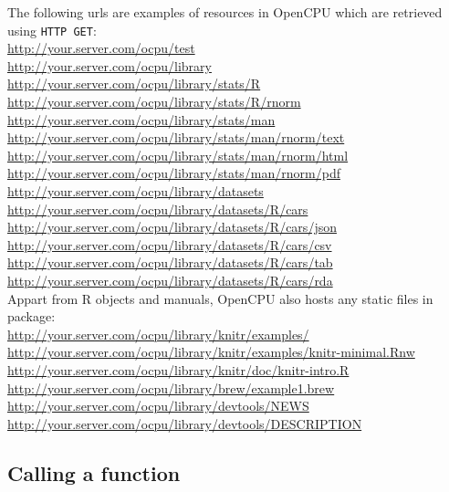 \documentclass{scrartcl}\usepackage[]{graphicx}\usepackage[]{color}
\begin{document}
\noindent The following urls are examples of resources in OpenCPU which are retrieved using \texttt{HTTP GET}:\\

\indent \url{http://your.server.com/ocpu/test} \\
\indent \url{http://your.server.com/ocpu/library} \\
\indent \url{http://your.server.com/ocpu/library/stats/R} \\
\indent \url{http://your.server.com/ocpu/library/stats/R/rnorm} \\
\indent \url{http://your.server.com/ocpu/library/stats/man} \\
\indent \url{http://your.server.com/ocpu/library/stats/man/rnorm/text} \\
\indent \url{http://your.server.com/ocpu/library/stats/man/rnorm/html} \\
\indent \url{http://your.server.com/ocpu/library/stats/man/rnorm/pdf} \\
\indent \url{http://your.server.com/ocpu/library/datasets} \\
\indent \url{http://your.server.com/ocpu/library/datasets/R/cars} \\
\indent \url{http://your.server.com/ocpu/library/datasets/R/cars/json} \\
\indent \url{http://your.server.com/ocpu/library/datasets/R/cars/csv} \\
\indent \url{http://your.server.com/ocpu/library/datasets/R/cars/tab} \\
\indent \url{http://your.server.com/ocpu/library/datasets/R/cars/rda} \\

\noindent Appart from R objects and manuals, OpenCPU also hosts any static files in package: \\

\indent \url{http://your.server.com/ocpu/library/knitr/examples/} \\
\indent \url{http://your.server.com/ocpu/library/knitr/examples/knitr-minimal.Rnw} \\
\indent \url{http://your.server.com/ocpu/library/knitr/doc/knitr-intro.R} \\
\indent \url{http://your.server.com/ocpu/library/brew/example1.brew} \\
\indent \url{http://your.server.com/ocpu/library/devtools/NEWS} \\
\indent \url{http://your.server.com/ocpu/library/devtools/DESCRIPTION} 


\subsection{Calling a function}
\end{document}
